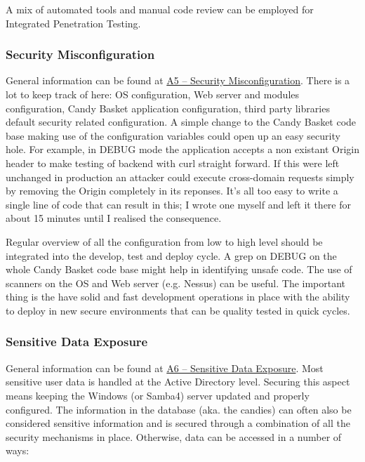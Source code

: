 \documentclass[letterpaper,10pt,english]{sphinxmanual}
\begin{document}
A mix of automated tools and manual code review can be employed for
Integrated Penetration Testing.


\subsubsection{Security Misconfiguration}
\label{developer-guide:security-misconfiguration}
General information can be found at \href{https://owasp.org/index.php/Top\_10\_2013-A5-Security\_Misconfiguration}{A5 -- Security Misconfiguration}. There
is a lot to keep track of here: OS configuration, Web server and
modules configuration, Candy Basket application configuration, third
party libraries default security related configuration. A simple
change to the Candy Basket code base making use of the configuration
variables could open up an easy security hole. For example, in DEBUG
mode the application accepts a non existant Origin header to make
testing of backend with curl straight forward. If this were left
unchanged in production an attacker could execute cross-domain
requests simply by removing the Origin completely in its
reponses. It's all too easy to write a single line of code that can
result in this; I wrote one myself and left it there for about 15
minutes until I realised the consequence.

Regular overview of all the configuration from low to high level
should be integrated into the develop, test and deploy cycle. A grep
on DEBUG on the whole Candy Basket code base might help in identifying
unsafe code. The use of scanners on the OS and Web server
(e.g. Nessus) can be useful. The important thing is the have solid and
fast development operations in place with the ability to deploy in new
secure environments that can be quality tested in quick cycles.


\subsubsection{Sensitive Data Exposure}
\label{developer-guide:sensitive-data-exposure}
General information can be found at \href{https://owasp.org/index.php/Top\_10\_2013-A6-Sensitive\_Data\_Exposure}{A6 -- Sensitive Data Exposure}. Most
sensitive user data is handled at the Active Directory level. Securing
this aspect means keeping the Windows (or Samba4) server updated and
properly configured. The information in the database (aka. the
candies) can often also be considered sensitive information and is
secured through a combination of all the security mechanisms in
place. Otherwise, data can be accessed in a number of ways:
\end{document}
